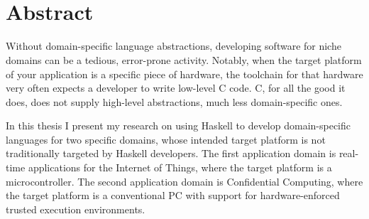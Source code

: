 \begin{raggedright}
\noindent 
{\large\textbf{\mytitle}}\\
\ifx\mysubtitle\undefined\else\textit{\small\mysubtitle}\fi
\end{raggedright}

\vskip 1mm
\noindent
{\sc\authorname}
\vskip 1mm
\noindent
\textit{\mydepartment}\\
\textit{\chalIgu}

\vskip 8mm

\section*{Abstract}

\noindent

Without domain-specific language abstractions, developing software for niche domains can be a tedious, error-prone activity.
Notably, when the target platform of your application is a specific piece of hardware, the toolchain for that hardware
very often expects a developer to write low-level C code. C, for all the good it does, does not supply high-level abstractions,
much less domain-specific ones.

In this thesis I present my research on using Haskell to develop domain-specific languages for two specific domains, whose
intended target platform is not traditionally targeted by Haskell developers. The first application domain is real-time applications
for the Internet of Things, where the target platform is a microcontroller. The second application domain is
Confidential Computing, where the target platform is a conventional PC with support for hardware-enforced trusted execution
environments.

\vspace{10 mm}

\vspace{3 mm}

